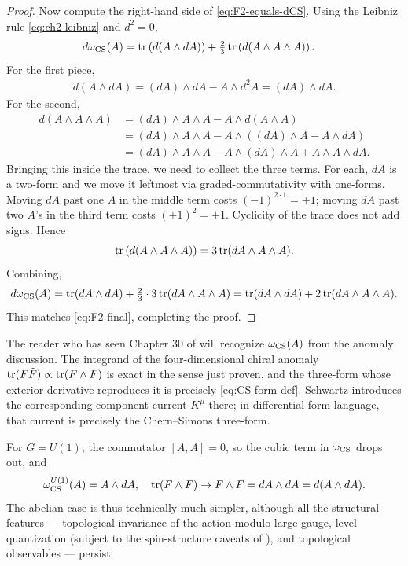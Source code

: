 \begin{proof}
\medskip

\noindent Now compute the right-hand side of \eqref{eq:F2-equals-dCS}. Using the Leibniz rule \eqref{eq:ch2-leibniz} and $d^2 = 0$,
\begin{align*}
d\omega_{\operatorname{CS}}(A) &= \operatorname{tr}\left(d(A\wedge dA)\right) + \tfrac{2}{3}\operatorname{tr}\left(d(A\wedge A\wedge A)\right).
\end{align*}
For the first piece,
\begin{align*}
d(A\wedge dA) = (dA)\wedge dA - A\wedge d^2 A = (dA)\wedge dA.
\end{align*}
For the second,
\begin{align*}
d(A\wedge A\wedge A) &= (dA)\wedge A\wedge A - A\wedge d(A\wedge A) \\
&= (dA)\wedge A\wedge A - A\wedge\left((dA)\wedge A - A\wedge dA\right) \\
&= (dA)\wedge A\wedge A - A\wedge (dA)\wedge A + A\wedge A\wedge dA.
\end{align*}
Bringing this inside the trace, we need to collect the three terms. For each, $dA$ is a two-form and we move it leftmost via graded-commutativity with one-forms. Moving $dA$ past one $A$ in the middle term costs $(-1)^{2\cdot 1} = +1$; moving $dA$ past two $A$'s in the third term costs $(+1)^2 = +1$. Cyclicity of the trace does not add signs. Hence
\begin{equation*}
\operatorname{tr}\left(d(A\wedge A\wedge A)\right) = 3\operatorname{tr}(dA\wedge A\wedge A).
\end{equation*}
Combining,
\begin{equation*}
d\omega_{\operatorname{CS}}(A) = \operatorname{tr}(dA\wedge dA) + \tfrac{2}{3}\cdot 3\operatorname{tr}(dA\wedge A\wedge A) = \operatorname{tr}(dA\wedge dA) + 2\operatorname{tr}(dA\wedge A\wedge A).
\end{equation*}
This matches \eqref{eq:F2-final}, completing the proof.
\end{proof}

\begin{remark}
The reader who has seen Chapter 30 of \cite{Schwartz2014QFT} will recognize $\omega_{\operatorname{CS}}(A)$ from the anomaly discussion. The integrand of the four-dimensional chiral anomaly $\operatorname{tr}(F\tilde F) \propto \operatorname{tr}(F\wedge F)$ is exact in the sense just proven, and the three-form whose exterior derivative reproduces it is precisely \eqref{eq:CS-form-def}. Schwartz introduces the corresponding component current $K^\mu$ there; in differential-form language, that current is precisely the Chern--Simons three-form.
\end{remark}

\begin{remark}\label{rem:abelian-CS}
For $G = U(1)$, the commutator $[A,A] = 0$, so the cubic term in $\omega_{\operatorname{CS}}$ drops out, and
\begin{equation*}
\omega_{\operatorname{CS}}^{U(1)}(A) = A\wedge dA, \quad \operatorname{tr}(F\wedge F) \to F\wedge F = dA\wedge dA = d(A\wedge dA).
\end{equation*}
The abelian case is thus technically much simpler, although all the structural features --- topological invariance of the action modulo large gauge, level quantization (subject to the spin-structure caveats of \cite{SeibergWitten2016Spin}), and topological observables --- persist.
\end{remark}

